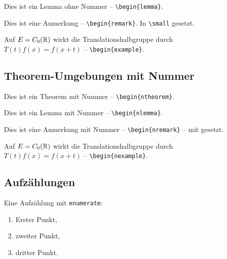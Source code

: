 \begin{refsection}
\begin{lemma}
Dies ist ein Lemma ohne Nummer -- \verb|\begin{lemma}|.
\end{lemma}

\begin{remark}
Dies ist eine Anmerkung -- \verb|\begin{remark}|.
In \verb|\small| gesetzt.
\end{remark}

\begin{example}
Auf $E = C_0(\mathbb{R})$ wirkt die Translationshalbgruppe durch
$T(t)f(x) = f(x+t)$ -- \verb|\begin{example}|.
\end{example}

\subsection*{Theorem-Umgebungen mit Nummer}
\setcounter{section}{1}

\begin{ntheorem}\label{thm:nummer}
Dies ist ein Theorem mit Nummer -- \verb|\begin{ntheorem}|.
\end{ntheorem}

\begin{nlemma}
Dies ist ein Lemma mit Nummer -- \verb|\begin{nlemma}|.
\end{nlemma}

\begin{nremark}
Dies ist eine Anmerkung mit Nummer -- \verb|\begin{nremark}| -- mit \texttt{\small} gesetzt.
\end{nremark}

\begin{nexample}
Auf $E = C_{0}(\mathbb{R})$ wirkt die Translationshalbgruppe durch
$T(t)f(x) = f(x+t)$ -- \verb|\begin{nexample}|.
\end{nexample}

\subsection*{Aufzählungen}

Eine Aufzählung mit \texttt{enumerate}:
\begin{enumerate}[\upshape(i)]
    \item Erster Punkt,
    \item zweiter Punkt,
    \item dritter Punkt.
\end{enumerate}


\end{refsection}
